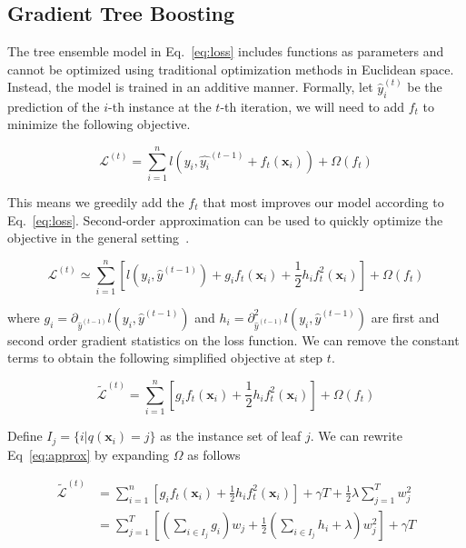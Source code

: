 \subsection{Gradient Tree Boosting} The tree ensemble model in Eq.~\eqref{eq:loss} includes functions as parameters  and cannot be optimized using  traditional optimization methods in Euclidean space. Instead, the model is trained in an additive manner. Formally, let $\hat{y}_i^{(t)}$ be the prediction of the $i$-th instance at the $t$-th iteration, we will need to add $f_t$ to minimize the following objective.

\begin{equation*}
\mathcal{L}^{(t)} = \sum_{i=1}^n l(y_i,\hat{y_i}^{(t-1)}+f_t(\mathbf{x}_i))+\Omega(f_t)
\end{equation*}

This means we greedily add the $f_t$ that most improves our model according to Eq.~\eqref{eq:loss}.
Second-order approximation can be used to quickly optimize the objective in the general setting~\cite{friedman2000additive}.

\begin{equation*}
\mathcal{L}^{(t)} \simeq \sum_{i=1}^n [l(y_i,\hat{y}^{(t-1)}) + g_i f_t(\mathbf{x}_i)+\frac{1}{2}h_i f_t^2(\mathbf{x}_i)] + \Omega(f_t)
\end{equation*}

where $g_i = \partial_{\hat{y}^{(t-1)}}l(y_i,\hat{y}^{(t-1)})$ and $h_i = \partial^2_{\hat{y}^{(t-1)}}l(y_i,\hat{y}^{(t-1)})$
are first and second order gradient statistics on the loss function. We can remove the constant terms to obtain the following simplified objective at step $t$.

\begin{equation}\label{eq:approx}
\tilde{\mathcal{L}}^{(t)} = \sum_{i=1}^n [g_i f_t(\mathbf{x}_i)+\frac{1}{2}h_i f_t^2(\mathbf{x}_i)] + \Omega(f_t)
\end{equation}

Define $I_j=\{i|q(\mathbf{x}_i)=j\}$ as the instance set of leaf $j$. We can rewrite Eq~\eqref{eq:approx} by expanding $\Omega$ as follows

\begin{equation}
\begin{split}
\tilde{\mathcal{L}}^{(t)}
         &=\sum^n_{i=1} [g_i f_t(\mathbf{x}_i)+\frac{1}{2}h_if_t^2(\mathbf{x}_i)]+\gamma T + \frac{1}{2}\lambda\sum^T_{j=1}w_j^2\\
         &=\sum^T_{j=1}[(\sum_{i\in I_j} g_i)w_j+\frac{1}{2}(\sum_{i\in I_j} h_i+\lambda)w_j^2]+\gamma T
\end{split}
\end{equation}

